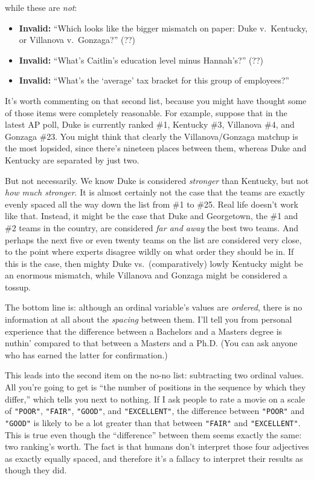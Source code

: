 \pagebreak
while these are \textit{not}:

\begin{itemize}[nosep]
\item \textbf{Invalid:} ``Which looks like the bigger mismatch on paper: Duke
v.~Kentucky, or Villanova v.~Gonzaga?'' (??)
\item \textbf{Invalid:} ``What's Caitlin's education level minus Hannah's?'' (??)
\item \textbf{Invalid:} ``What's the `average' tax bracket for this group of
employees?''
\end{itemize}

It's worth commenting on that second list, because you might have thought some
of those items were completely reasonable. For example, suppose that in the
latest AP poll, Duke is currently ranked \#1, Kentucky \#3, Villanova \#4, and
Gonzaga \#23. You might think that clearly the Villanova/Gonzaga matchup is the
most lopsided, since there's nineteen places between them, whereas Duke and
Kentucky are separated by just two.

But not necessarily. We know Duke is considered \textit{stronger} than
Kentucky, but not \textit{how much stronger}. It is almost certainly not the
case that the teams are exactly evenly spaced all the way down the list from
\#1 to \#25. Real life doesn't work like that. Instead, it might be the case
that Duke and Georgetown, the \#1 and \#2 teams in the country, are considered
\textit{far and away} the best two teams. And perhaps the next five or even
twenty teams on the list are considered very close, to the point where experts
disagree wildly on what order they should be in. If this is the case, then
mighty Duke vs.~(comparatively) lowly Kentucky might be an enormous mismatch,
while Villanova and Gonzaga might be considered a tossup.

The bottom line is: although an ordinal variable's values are \textit{ordered},
there is no information at all about the \textit{spacing} between them. I'll
tell you from personal experience that the difference between a Bachelors and a
Masters degree is nuthin' compared to that between a Masters and a Ph.D. (You
can ask anyone who has earned the latter for confirmation.)

This leads into the second item on the no-no list: subtracting two ordinal
values. All you're going to get is ``the number of positions in the sequence by
which they differ,'' which tells you next to nothing. If I ask people to rate a
movie on a scale of \texttt{"POOR"}, \texttt{"FAIR"}, \texttt{"GOOD"}, and
\texttt{"EXCELLENT"}, the difference between \texttt{"POOR"} and
\texttt{"GOOD"} is likely to be a lot greater than that between \texttt{"FAIR"}
and \texttt{"EXCELLENT"}. This is true even though the ``difference'' between
them seems exactly the same: two ranking's worth. The fact is that humans
don't interpret those four adjectives as exactly equally spaced, and therefore
it's a fallacy to interpret their results as though they did.

